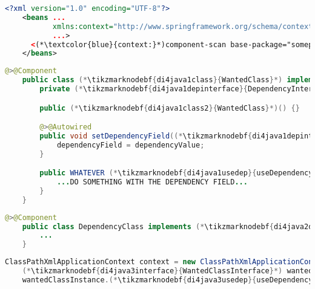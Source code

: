 \enlargethispage{10mm}
\thispagestyle{empty}
\label{setterinjectionautowire}
\begin{lstlisting}[language=XML, title={Configuration XML}]
    <?xml version="1.0" encoding="UTF-8"?>
    <beans ...
           xmlns:context="http://www.springframework.org/schema/context"
           ...>
      <(*\textcolor{blue}{context:}*)component-scan base-package="somepackage.subpackage"/>
    </beans>
\end{lstlisting}
\begin{lstlisting}[language=Java, title={Wanted class with the zero--parameter constructor and the setter method}]
    @>@Component
    public class (*\tikzmarknodebf{di4java1class}{WantedClass}*) implements (*\tikzmarknodebf{di4java1interface}{WantedClassInterface}*) {
        private (*\tikzmarknodebf{di4java1depinterface}{DependencyInterface}*) dependencyField;

        public (*\tikzmarknodebf{di4java1class2}{WantedClass}*)() {}

        @>@Autowired
        public void setDependencyField((*\tikzmarknodebf{di4java1depinterface2}{DependencyInterface}*) dependencyValue) {
            dependencyField = dependencyValue;
        }

        public WHATEVER (*\tikzmarknodebf{di4java1usedep}{useDependency}*)() {
            ...DO SOMETHING WITH THE DEPENDENCY FIELD...
        }
    }
\end{lstlisting}
\begin{lstlisting}[language=Java, title={Dependency class}]
    @>@Component
    public class DependencyClass implements (*\tikzmarknodebf{di4java2depinterface}{DependencyInterface}*) {
        ...
    }
\end{lstlisting}
\begin{lstlisting}[language=Java, title={Usage}]
    ClassPathXmlApplicationContext context = new ClassPathXmlApplicationContext("configurationFile.xml");
    (*\tikzmarknodebf{di4java3interface}{WantedClassInterface}*) wantedClassInstance = context.getBean("(*\tikzmarknodebf{di4java3beanid}{wantedClass}[ForestGreen]*)", (*\tikzmarknodebf{di4java3interface2}{WantedClassInterface}*).class);
    wantedClassInstance.(*\tikzmarknodebf{di4java3usedep}{useDependency}*)();
\end{lstlisting}

